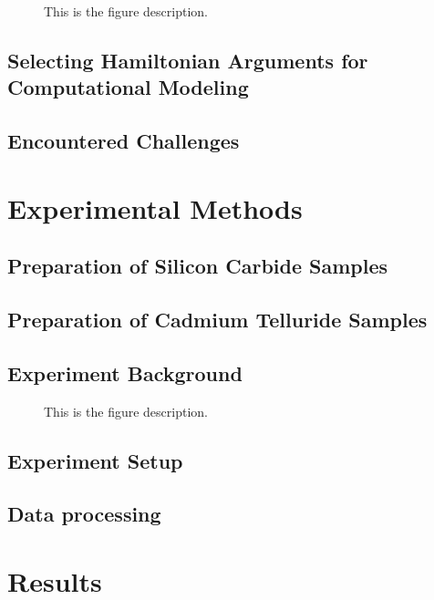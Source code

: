 \documentclass[oneside, astronomy, noacknowlegments]{BYUPhys}
\begin{document}
\begin{figure}
    \caption[Example of spin-hamiltonion fields]{\label{fig:HamFields}
     This is the figure description.}
 \end{figure}

\section{Selecting Hamiltonian Arguments for Computational Modeling}

\section{Encountered Challenges}

\chapter{Experimental Methods}

\section{Preparation of Silicon Carbide Samples}

\section{Preparation of Cadmium Telluride Samples}

\section{Experiment Background}

\begin{figure}
    \caption[SiC energy levels and zero-field splitting]{\label{fig:SiCZeeman}
     This is the figure description.}
 \end{figure}

\section{Experiment Setup}
\label{sec:Experiment}

\section{Data processing}

\chapter{Results}
\end{document}

